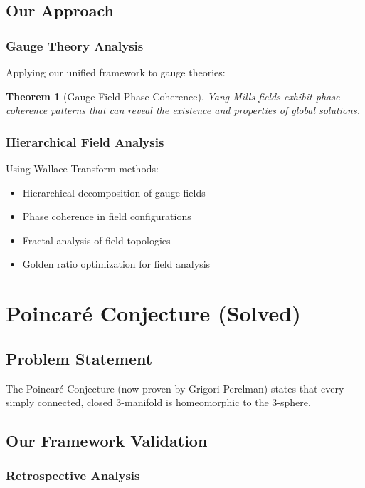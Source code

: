 \documentclass[12pt]{article}
\newtheorem{theorem}{Theorem}
\begin{document}
\subsection{Our Approach}

\subsubsection{Gauge Theory Analysis}

Applying our unified framework to gauge theories:

\begin{theorem}[Gauge Field Phase Coherence]
Yang-Mills fields exhibit phase coherence patterns that can reveal the existence and properties of global solutions.
\end{theorem}

\subsubsection{Hierarchical Field Analysis}

Using Wallace Transform methods:
\begin{itemize}
    \item Hierarchical decomposition of gauge fields
    \item Phase coherence in field configurations
    \item Fractal analysis of field topologies
    \item Golden ratio optimization for field analysis
\end{itemize}

\section{Poincaré Conjecture (Solved)}

\subsection{Problem Statement}
The Poincaré Conjecture (now proven by Grigori Perelman) states that every simply connected, closed 3-manifold is homeomorphic to the 3-sphere.

\subsection{Our Framework Validation}

\subsubsection{Retrospective Analysis}
\end{document}

